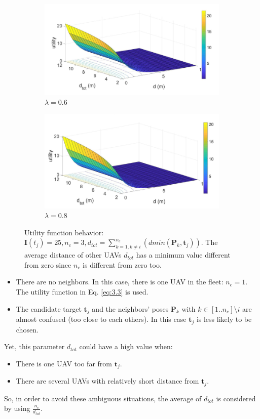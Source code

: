 \documentclass[11pt,openany]{book}
\begin{document}
\begin{figure}[H]
    \begin{subfigure}[H]{0.4\linewidth}
        \centering
        \includegraphics[width=\linewidth]{assets/3_8_c.png}
        \caption{{$\lambda=0.6$}}
        \label{fig:3.8c}
    \end{subfigure}
    \begin{subfigure}[H]{0.4\linewidth}
        \centering
        \includegraphics[width=\linewidth]{assets/3_8_d.png}
        \caption{{$\lambda=0.8$}}
        \label{fig:3.8d}
    \end{subfigure}
    \caption{{Utility function behavior: $\mathbf{I}(t_j)=25, n_c=3, d_{tot} = \sum_{k=1, k\neq i}^{n_c}(dmin(\mathbf{P}_k,\mathbf{t}_j))$. The average distance of other UAVs $d_{tot}$ has a minimum value different from zero since $n_c$ is different from zero too.}}
    \label{fig:3.8}
\end{figure}
\begin{itemize}
    \item There are no neighbors. In this case, there is one UAV in the ﬂeet: $n_c=1$. The utility function in Eq. \ref{eq:3.3} is used.
    \item The candidate target $\mathbf{t}_j$ and the neighbors’ poses $\mathbf{P}_k$ with $k \in [1..n_c]\setminus i$ are almost confused (too close to each others). In this case $\mathbf{t}_j$ is less likely to be chosen.
\end{itemize}
Yet, this parameter $d_{tot}$ could have a high value when:
\begin{itemize}
    \item There is one UAV too far from $\mathbf{t}_j$.
    \item There are several UAVs with relatively short distance from $\mathbf{t}_j$.
\end{itemize}
So, in order to avoid these ambiguous situations, the average of $d_{tot}$ is considered by using $\frac{n_c}{d_{tot}}$.
\end{document}
